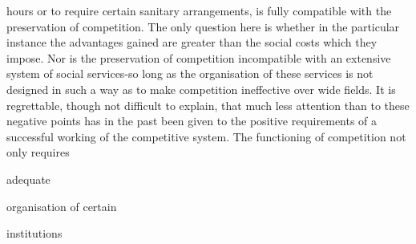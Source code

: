 \documentclass[11pt,openany]{book}
\begin{document}
hours or to require certain sanitary arrangements, is fully compatible with the preservation of competition. The only question here is whether in the particular instance the advantages gained are greater than the social costs which they impose. Nor is the preservation of competition incompatible with an extensive system of social services-so long as the organisation of these services is not designed in such a way as to make competition ineffective over wide fields. It is regrettable, though not difficult to explain, that much less attention than to these negative points has in the past been given to the positive requirements of a successful working of the competitive system. The functioning of competition not only requires

adequate

organisation of certain

institutions
\end{document}
